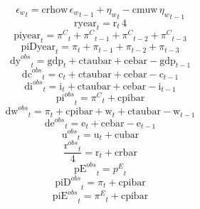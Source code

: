 \begin{dmath}
{{\epsilon_{w}}}_{t}={{\mathrm{crhow}}}\, {{\epsilon_{w}}}_{t-1}+{{\eta_{w}}}_{t}-{{\mathrm{cmuw}}}\, {{\eta_{w}}}_{t-1}
\end{dmath}
\begin{dmath}
{{\mathrm{ryear}}}_{t}={{\mathrm{r}}}_{t}\, 4
\end{dmath}
\begin{dmath}
{{\mathrm{piyear}}}_{t}={{\pi^{C}}}_{t}+{{\pi^{C}}}_{t-1}+{{\pi^{C}}}_{t-2}+{{\pi^{C}}}_{t-3}
\end{dmath}
\begin{dmath}
{{\mathrm{piDyear}}}_{t}={{\pi}}_{t}+{{\pi}}_{t-1}+{{\pi}}_{t-2}+{{\pi}}_{t-3}
\end{dmath}
\begin{dmath}
{{\mathrm{dy}^{obs}}}_{t}={{\mathrm{gdp}}}_{t}+{{\mathrm{ctaubar}}}+{{\mathrm{cebar}}}-{{\mathrm{gdp}}}_{t-1}
\end{dmath}
\begin{dmath}
{{\mathrm{dc}^{obs}}}_{t}={{\mathrm{c}}}_{t}+{{\mathrm{ctaubar}}}+{{\mathrm{cebar}}}-{{\mathrm{c}}}_{t-1}
\end{dmath}
\begin{dmath}
{{\mathrm{di}^{obs}}}_{t}={{\mathrm{i}}}_{t}+{{\mathrm{ctaubar}}}+{{\mathrm{cebar}}}-{{\mathrm{i}}}_{t-1}
\end{dmath}
\begin{dmath}
{{\mathrm{pi}^{obs}}}_{t}={{\pi^{C}}}_{t}+{{\mathrm{cpibar}}}
\end{dmath}
\begin{dmath}
{{\mathrm{dw}^{obs}}}_{t}={{\pi}}_{t}+{{\mathrm{cpibar}}}+{{\mathrm{w}}}_{t}+{{\mathrm{ctaubar}}}-{{\mathrm{w}}}_{t-1}
\end{dmath}
\begin{dmath}
{{\mathrm{de}^{obs}}}_{t}={{\mathrm{e}}}_{t}+{{\mathrm{cebar}}}-{{\mathrm{e}}}_{t-1}
\end{dmath}
\begin{dmath}
{{\mathrm{u}^{obs}}}_{t}={{\mathrm{u}}}_{t}+{{\mathrm{cubar}}}
\end{dmath}
\begin{dmath}
\frac{{{\mathrm{r}^{obs}}}_{t}}{4}={{\mathrm{r}}}_{t}+{{\mathrm{crbar}}}
\end{dmath}
\begin{dmath}
{{\mathrm{pE}^{obs}}}_{t}={{p^{E}}}_{t}
\end{dmath}
\begin{dmath}
{{\mathrm{piD}^{obs}}}_{t}={{\pi}}_{t}+{{\mathrm{cpibar}}}
\end{dmath}
\begin{dmath}
{{\mathrm{piE}^{obs}}}_{t}={{\pi^{E}}}_{t}+{{\mathrm{cpibar}}}
\end{dmath}
